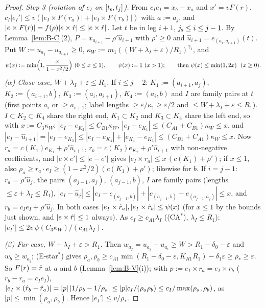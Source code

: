 \begin{proof}
\emph{Step 3 (rotation of $e_I$ on $[t_{\mathrm s},t_j]$).} From $c_Ie_I=x_b-x_a$ and $x'=vF(r)$,
$c_I|e_I'|\le v(|e_I\times F(r_a)|+|e_I\times F(r_b)|)$ with $a:=a_j$, and $|e\times F(r)|=f(\rho)|e\times\hat r|\le|e\times\hat r|$. Let
$t$ be in leg $i+1$, $j_{\mathrm s}\le i\le j-1$. By Lemma~\ref{lem:B-C}(2), $P=x_{a_{i+1}}-\rho'\hat u_{i+1}$ with $\rho'\ge0$ and
$\hat u_{i+1}=e_{(a_i,a_{i+1})}(t)$. Put $W:=u_{a_j}-u_{a_{i+1}}\ge0$, $\kappa_W:=m_1((W+\lambda_I+\varepsilon)/R_1)^{\gamma_1}$, and
\[
\psi(x):=\min\Bigl(1,\frac x{1-x^2/2}\Bigr)\ (0\le x\le1),\qquad\psi(x):=1\ (x>1);\qquad\text{then }\psi(x)\le\min(1,2x)\ \ (x\ge0).
\]
\emph{($\alpha$) Close case, $W+\lambda_I+\varepsilon\le R_1$.} If $i\le j-2$: $K_1:=(a_{i+1},a_j)$, $K_2:=(a_{i+1},b)$,
$K_3:=(a_i,a_{i+1})$, $K_4:=(a_i,b)$ and $I$ are family pairs at $t$ (first points $a_i$ or $\ge a_{i+1}$; label lengths
$\ge\varepsilon/\kappa_1\ge\varepsilon/2$ and $\le W+\lambda_I+\varepsilon\le R_1$). $I\subset K_2\subset K_4$ share the right end,
$K_1\subset K_2$ and $K_3\subset K_4$ share the left end, so with $x:=C_3\kappa_W$:
$|e_I-e_{K_2}|\le C_{B1}\kappa_W$, $|e_I-e_{K_1}|\le(C_{A1}+C_{B1})\kappa_W\le x$, and
$|e_I-\hat u_{i+1}|=|e_I-e_{K_3}|\le|e_I-e_{K_4}|+|e_{K_4}-e_{K_3}|\le(C_{B1}+C_{A1})\kappa_W\le x$. Now
$r_a=c(K_1)e_{K_1}+\rho'\hat u_{i+1}$, $r_b=c(K_2)e_{K_2}+\rho'\hat u_{i+1}$ with non-negative coefficients, and
$|e\times e'|\le|e-e'|$ gives $|e_I\times r_a|\le x\,(c(K_1)+\rho')$; if $x\le1$, also
$\rho_a\ge r_a\cdot e_I\ge(1-x^2/2)(c(K_1)+\rho')$; likewise for $b$. If $i=j-1$: $r_a=\rho'\hat u_j$, the pairs
$(a_{j-1},a_j)$, $(a_{j-1},b)$, $I$ are family pairs (lengths $\le\varepsilon+\lambda_I\le R_1$),
$|e_I-\hat u_j|\le|e_I-e_{(a_{j-1},b)}|+|e_{(a_{j-1},b)}-e_{(a_{j-1},a_j)}|\le x$, and $r_b=c_Ie_I+\rho'\hat u_j$. In both cases
$|e_I\times\hat r_a|,|e_I\times\hat r_b|\le\psi(x)$ (for $x\le1$ by the bounds just shown, and $|e\times\hat r|\le1$ always). As
$c_I\ge c_{A1}\lambda_I$ ((CA$^*$), $\lambda_I\le R_1$): $|e_I'|\le2v\,\psi(C_3\kappa_W)/(c_{A1}\lambda_I)$.

\emph{($\beta$) Far case, $W+\lambda_I+\varepsilon>R_1$.} Then $w_{a_j}=u_{a_j}-u_{a_i}\ge W>R_1-\delta_0-\varepsilon$ and $w_b\ge w_{a_j}$;
(E-star$^*$) gives $\rho_a,\rho_b\ge c_{A1}\min(R_1-\delta_0-\varepsilon,K_{R1}R_1)-\delta_1\varepsilon\ge\rho_*\ge\varepsilon$. So
$F(r)=\hat r$ at $a$ and $b$ (Lemma~\ref{lem:B-V}(i)); with $p:=e_I\times r_a=e_I\times r_b$ ($r_b-r_a=c_Ie_I$),
$|e_I\times(\hat r_b-\hat r_a)|=|p|\,|1/\rho_b-1/\rho_a|\le|p|c_I/(\rho_a\rho_b)\le c_I/\max(\rho_a,\rho_b)$, as
$|p|\le\min(\rho_a,\rho_b)$. Hence $|e_I'|\le v/\rho_*$.


\end{proof}
